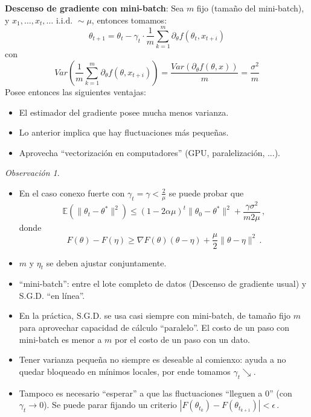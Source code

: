 \documentclass[letterpaper,11pt]{article} %
\theoremstyle{defbreak}
\theoremstyle{propbreak}
\theoremstyle{remark}
\newtheorem{remark}{Observación}[subsection]
\theoremstyle{break}
\def\E{\mathbb{E}}
\def\iid{\mbox{ i.i.d. }}
\def\beforeitemize{\leavevmode \vspace{-0.5\baselineskip}}
\begin{document}
\newp \textbf{Descenso de gradiente con mini-batch}:
\newline Sea $m$ fijo (tamaño del mini-batch), y $x_1,\dots,x_t,\dots \iid \sim \mu$, entonces tomamos:
$$ \theta_{t+1}=\theta_t - \gamma_t\cdot \displaystyle\frac{1}{m}\sum^m_{k=1}\partial_\theta f(\theta_t,x_{t+i})$$
con
$$ Var(\displaystyle \frac{1}{m}\sum^m_{k=1}\partial_\theta f(\theta,x_{t+i}))=\frac{Var(\partial_\theta f(\theta,x))}{m}=\frac{\sigma^2}{m}$$
Posee entonces las siguientes ventajas:
\begin{itemize}
    \item El estimador del gradiente posee mucha menos varianza.
    \item Lo anterior implica que hay fluctuaciones más pequeñas.
    \item Aprovecha ``vectorización en computadores'' (GPU, paralelización, ...).
\end{itemize}
\begin{remark}
\beforeitemize
\begin{itemize}
    \item En el caso conexo fuerte con $\gamma_t=\gamma<\frac{2}{\mu}$ se puede probar que
    $$ \E(\|\theta_t-\theta^*\|^2)\leq (1-2 \alpha \mu)^t\|\theta_0-\theta^*\|^2+\frac{\gamma \sigma^2}{m 2\mu}\,,$$
    donde 
    $$ F(\theta)-F(\eta)\geq \nabla F(\theta)(\theta-\eta)+\frac{\mu}{2}\|\theta-\eta\|^2\,.$$
    \item $m$ y $\eta_t$ se deben ajustar conjuntamente.
    \item ``mini-batch'': entre el lote completo de datos (Descenso de gradiente usual) y S.G.D. ``en línea''.
    \item En la práctica, S.G.D. se usa casi siempre con mini-batch, de tamaño fijo $m$ para aprovechar capacidad de cálculo ``paralelo''. El costo de un paso con mini-batch es menor a $m$ por el costo de un paso con un dato.
    \item Tener varianza pequeña no siempre es deseable al comienxo: ayuda a no quedar bloqueado en mínimos locales, por ende tomamos $\gamma_t\searrow$.
    \item Tampoco es necesario ``esperar'' a que las fluctuaciones ``lleguen a $0$'' (con $\gamma_t\to 0$).
    \newline Se puede parar fijando un criterio $|F(\theta_{t_k})-F(\theta_{t_{k+1}})|<\epsilon$\,.
\end{itemize}
\end{remark}
\end{document}
